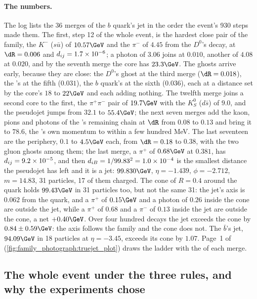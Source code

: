 \paragraph{The numbers.} The  log lists the 36 merges of the
$b$ quark's jet in the order the event's 930 steps made them. The first,
step 12 of the whole event, is the hardest close pair of the family, the
$K^-$ ($s\bar u$) of $10.57\GeV$ and the $\pi^-$ of $4.45$ from the
$D^0$'s decay, at $\dR=0.006$ and $d_{ij}=1.7\times10^{-6}$; a photon of
$3.06$ joins at $0.010$, another of $4.08$ at $0.020$, and by the seventh
merge the core has $23.3\GeV$. The ghosts arrive early, because they are
close: the $D^0$'s ghost at the third merge ($\dR=0.018$), the \Bbar's at
the fifth ($0.031$), the $b$ quark's at the sixth ($0.036$), each at a
distance set by the core's $18$ to $22\GeV$ and each adding nothing. The
twelfth merge joins a second core to the first, the $\pi^+\pi^-$ pair of
$19.7\GeV$ with the $K_S^0$ ($d\bar s$) of $9.0$, and the pseudojet jumps
from $32.1$ to $55.4\GeV$; the next seven merges add the kaon, pions and
photons of the \Bbar's remaining chain at $\dR$ from $0.08$ to $0.13$ and
bring it to $78.6$, the \Bbar's own momentum to within a few hundred MeV.
The last seventeen are the periphery, $0.1$ to $4.5\GeV$ each, from
$\dR=0.18$ to $0.38$, with the two gluon ghosts among them; the last
merge, a $\pi^+$ of $0.68\GeV$ at $0.381$, has $d_{ij}=9.2\times10^{-5}$, and
then $d_{iB}=1/99.83^2=1.0\times10^{-4}$ is the smallest distance the
pseudojet has left and it is a jet: $99.830\GeV$, $\eta=-1.439$,
$\phi=-2.712$, $m=14.83$, 31 particles, 17 of them charged. The cone of
$R=0.4$ around the quark holds $99.43\GeV$ in 31 particles too, but not
the same 31: the jet's axis is $0.062$ from the quark, and a $\pi^+$ of
$0.15\GeV$ and a photon of $0.26$ inside the cone are outside the jet,
while a $\pi^+$ of $0.68$ and a $\pi^-$ of $0.13$ inside the jet are
outside the cone, a net $+0.40\GeV$. Over four hundred decays the jet
exceeds the cone by $0.84\pm0.59\GeV$: the axis follows the family and the
cone does not. The $\bar b$'s jet, $94.09\GeV$ in 18 particles at
$\eta=-3.45$, exceeds its cone by $1.07$. Page~1 of
 (\cref{fig:family_photograph:truejet_plot})
draws the ladder with the \dR of each merge.

\subsection{The whole event under the three rules, and why the experiments chose \antikt}
\label{sec:family_photograph:three_rules}

